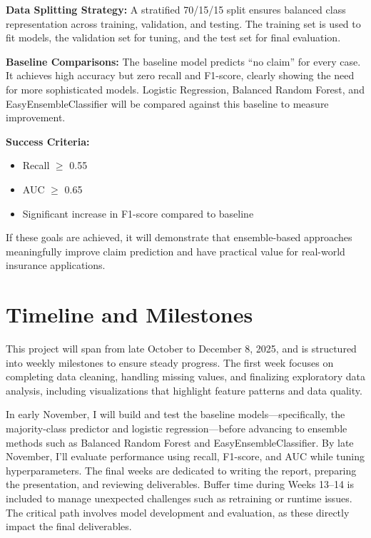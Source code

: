 \documentclass[11pt]{article}
\begin{document}
\textbf{Data Splitting Strategy:}  
A stratified 70/15/15 split ensures balanced class representation across training, validation, and testing. The training set is used to fit models, the validation set for tuning, and the test set for final evaluation.

\textbf{Baseline Comparisons:}  
The baseline model predicts “no claim” for every case. It achieves high accuracy but zero recall and F1-score, clearly showing the need for more sophisticated models. Logistic Regression, Balanced Random Forest, and EasyEnsembleClassifier will be compared against this baseline to measure improvement.

\textbf{Success Criteria:}
\begin{itemize}
    \item Recall $\geq$ 0.55
    \item AUC $\geq$ 0.65
    \item Significant increase in F1-score compared to baseline
\end{itemize}

If these goals are achieved, it will demonstrate that ensemble-based approaches meaningfully improve claim prediction and have practical value for real-world insurance applications.

\section{Timeline and Milestones}
This project will span from late October to December 8, 2025, and is structured into weekly milestones to ensure steady progress. The first week focuses on completing data cleaning, handling missing values, and finalizing exploratory data analysis, including visualizations that highlight feature patterns and data quality.

In early November, I will build and test the baseline models—specifically, the majority-class predictor and logistic regression—before advancing to ensemble methods such as Balanced Random Forest and EasyEnsembleClassifier. By late November, I’ll evaluate performance using recall, F1-score, and AUC while tuning hyperparameters. The final weeks are dedicated to writing the report, preparing the presentation, and reviewing deliverables. Buffer time during Weeks 13–14 is included to manage unexpected challenges such as retraining or runtime issues. The critical path involves model development and evaluation, as these directly impact the final deliverables.
\end{document}
